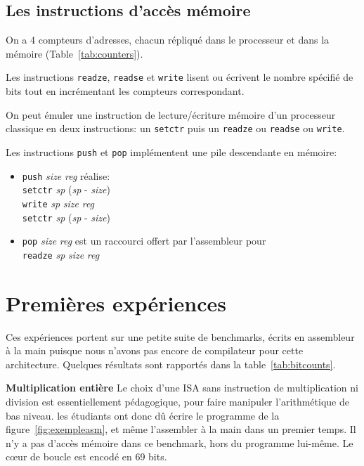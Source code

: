 \documentclass[architecture]{compas2018}
\begin{document}
\subsection{Les instructions d'accès mémoire}
\label{sec:mem}



On a 4 compteurs d'adresses, chacun  répliqué dans le processeur et dans la mémoire (Table~\ref{tab:counters}).


Les instructions \texttt{readze}, \texttt{readse} et \texttt{write} lisent ou écrivent le nombre spécifié de bits tout en incrémentant les compteurs correspondant.

On peut émuler une instruction de lecture/écriture mémoire d'un processeur classique en deux instructions: un \texttt{setctr} puis un \texttt{readze} ou \texttt{readse} ou \texttt{write}.

Les instructions \texttt{push} et \texttt{pop} implémentent une pile descendante en mémoire: 
\begin{itemize}
\item \texttt{push} \emph{size} \emph{reg} réalise: \\
   \texttt{setctr} \textit{sp} (\textit{sp} - \textit{size})\\ \texttt{write}  \textit{sp} \textit{size} \textit{reg} \\ \texttt{setctr} \textit{sp} (\textit{sp} - \textit{size})
\item \texttt{pop} \emph{size} \emph{reg} est un raccourci offert par l'assembleur pour \\\texttt{readze} \textit{sp} \emph{size} \emph{reg}\\
  
\end{itemize}

\fi

\section{Premières expériences}
Ces expériences portent sur une petite suite de benchmarks, écrits en assembleur à la main puisque nous n'avons pas encore de compilateur pour cette architecture.
Quelques résultats sont rapportés dans la table~\ref{tab:bitcounts}.

\textbf{Multiplication entière} Le choix d'une ISA sans instruction de multiplication ni division est essentiellement pédagogique, pour faire manipuler l'arithmétique de bas niveau.
les étudiants ont donc dû écrire le programme de la figure~\ref{fig:exempleasm}, et même l'assembler à la main dans un premier temps.
Il n'y a pas d'accès mémoire dans ce benchmark, hors du programme lui-même.
Le c\oe ur de boucle est encodé en 69 bits.
\end{document}
